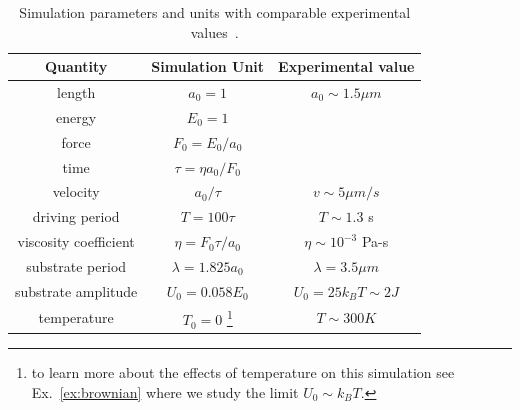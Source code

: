 \documentclass[twocolumn,preprintnumbers,amsmath,amssymb,aps,prx]{revtex4}
\begin{document}
\begin{table}[h!]
\centering
\caption{Simulation parameters and units with comparable
  experimental values~\cite{Juniper2015}.}
\begin{ruledtabular}
\begin{tabular}{c c c } %
Quantity & Simulation Unit & Experimental value\\
\hline
length &  $a_0 = 1$ & $ a_0 \sim 1.5 \mu m$\\
energy & $E_0 = 1$ & \\ %
force & $F_0 = E_0 / a_0$ & \\ %
time &  $ \tau = \eta a_0 / F_0 $ \\ %
velocity &  $ a_0 / \tau $ &  $v \sim 5 \mu m/s $\\
driving period & $T = 100 \tau$ & $T \sim 1.3$ s \\ %
viscosity coefficient & $\eta = F_0 \tau / a_0 $ & $\eta \sim 10^{-3}$ Pa-s \\
substrate period & $\lambda = 1.825 a_0$ & $\lambda = 3.5 \mu m$ \\
substrate amplitude & $U_0 = 0.058 E_0$ & $U_0 = 25 k_B T \sim 2 J$ \\
temperature & $T_0 = 0$ \footnote{to learn more about the effects
  of temperature on this simulation
  see Ex.~\ref{ex:brownian} where we study the limit
  $U_0 \sim k_B T$.} & $T \sim 300K $ \\


\end{tabular}
\end{ruledtabular}
\end{table}
\end{document}
